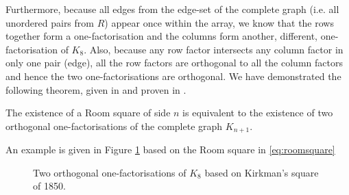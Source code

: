 Furthermore, because all edges from the edge-set of the complete graph (i.e. all unordered pairs from $R$) appear once within the array, we know that the rows together form a one-factorisation and the columns form another, different, one-factorisation of $K_8$.
Also, because any row factor intersects any column factor in only one pair (edge), all the row factors are orthogonal to all the column factors and hence the two one-factorisations are orthogonal.
We have demonstrated the following theorem, given in
\cite{dinitzContemporaryDesignTheory1992}
and proven in
\cite{nemethStudyRoomSquares1969}.

\begin{theorem}
The existence of a Room square of side $n$ is equivalent to the existence of two orthogonal one-factorisations of the complete graph $K_{n+1}$.
\end{theorem}

An example is given in Figure \ref{fig:kirkmans-square} based on the Room square in \eqref{eq:roomsquare}

\begin{figure}
  \centering
  
  \caption{Two orthogonal one-factorisations of $K_{8}$ based on Kirkman's square of 1850.}
  \label{fig:kirkmans-square}
\end{figure}
